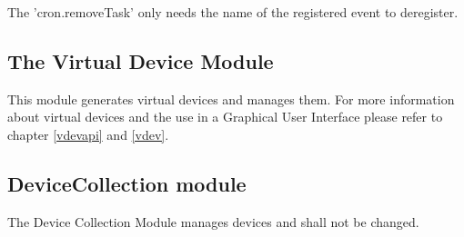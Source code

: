 The 'cron.removeTask' only needs the name of the registered event to deregister.

\subsection{The Virtual Device Module}

This module generates virtual devices and manages them. For more information about
virtual devices and the use in a Graphical User Interface please refer to
chapter \ref {vdevapi} and \ref{vdev}.

\subsection{DeviceCollection module}

The Device Collection Module manages devices and shall not be changed.